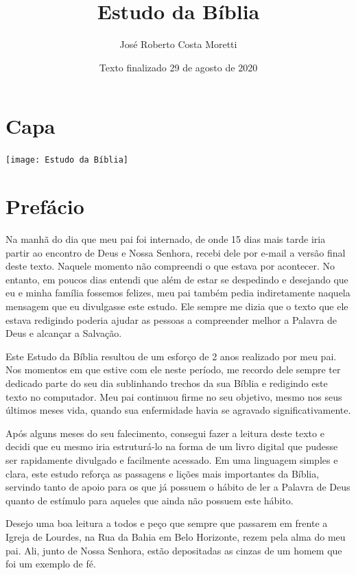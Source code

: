 \documentclass[
]{book}
\title{Estudo da Bíblia}
\author{José Roberto Costa Moretti}
\date{Texto finalizado 29 de agosto de 2020}
\begin{document}
\maketitle

{
\setcounter{tocdepth}{1}
\tableofcontents
}
\hypertarget{capa}{%
\chapter*{Capa}\label{capa}}

\begin{center}\texttt{[image: Estudo da Bíblia]} \end{center}

\hypertarget{prefuxe1cio}{%
\chapter*{Prefácio}\label{prefuxe1cio}}

Na manhã do dia que meu pai foi internado, de onde 15 dias mais tarde iria partir ao encontro de Deus e Nossa Senhora, recebi dele por e-mail a versão final deste texto. Naquele momento não compreendi o que estava por acontecer. No entanto, em poucos dias entendi que além de estar se despedindo e desejando que eu e minha família fossemos felizes, meu pai também pedia indiretamente naquela mensagem que eu divulgasse este estudo. Ele sempre me dizia que o texto que ele estava redigindo poderia ajudar as pessoas a compreender melhor a Palavra de Deus e alcançar a Salvação.

Este Estudo da Bíblia resultou de um esforço de 2 anos realizado por meu pai. Nos momentos em que estive com ele neste período, me recordo dele sempre ter dedicado parte do seu dia sublinhando trechos da sua Bíblia e redigindo este texto no computador. Meu pai continuou firme no seu objetivo, mesmo nos seus últimos meses vida, quando sua enfermidade havia se agravado significativamente.

Após alguns meses do seu falecimento, consegui fazer a leitura deste texto e decidi que eu mesmo iria estruturá-lo na forma de um livro digital que pudesse ser rapidamente divulgado e facilmente acessado. Em uma linguagem simples e clara, este estudo reforça as passagens e lições mais importantes da Bíblia, servindo tanto de apoio para os que já possuem o hábito de ler a Palavra de Deus quanto de estímulo para aqueles que ainda não possuem este hábito.

Desejo uma boa leitura a todos e peço que sempre que passarem em frente a Igreja de Lourdes, na Rua da Bahia em Belo Horizonte, rezem pela alma do meu pai. Ali, junto de Nossa Senhora, estão depositadas as cinzas de um homem que foi um exemplo de fé.
\end{document}
